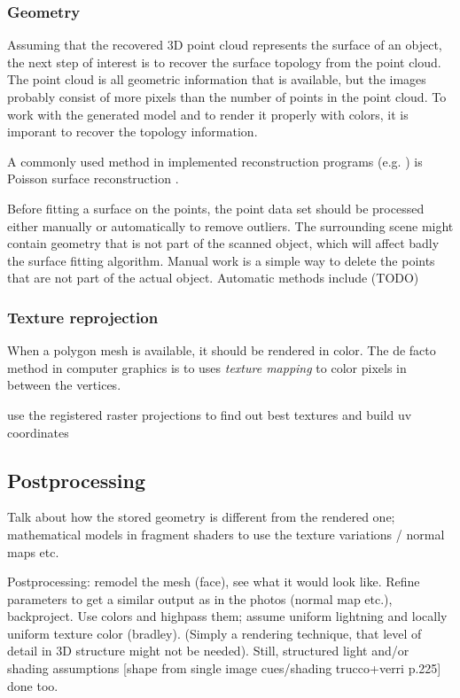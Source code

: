 
\subsubsection{Geometry} %

Assuming that the recovered 3D point cloud represents the surface of an object, the next step of interest is to recover the surface topology from the point cloud.
The point cloud is all geometric information that is available, but the images probably consist of more pixels than the number of points in the point cloud.
To work with the generated model and to render it properly with colors, it is imporant to recover the topology information.

A commonly used method in implemented reconstruction programs (e.g. \cite{meshlab}) is Poisson surface reconstruction \cite{kazhdan2013screened}.

Before fitting a surface on the points, the point data set should be processed either manually or automatically to remove outliers.
The surrounding scene might contain geometry that is not part of the scanned object, which will affect badly the surface fitting algorithm.
Manual work is a simple way to delete the points that are not part of the actual object. Automatic methods include (TODO)


\subsubsection{Texture reprojection} %

When a polygon mesh is available, it should be rendered in color. The de facto method in computer graphics is to uses \textit{texture mapping} to color pixels in between the vertices.

use the registered raster projections to find out best textures and build uv coordinates


\subsection{Postprocessing} %

Talk about how the stored geometry is different from the rendered one; mathematical models in fragment shaders to use the texture variations / normal maps etc.

Postprocessing: remodel the mesh (face), see what it would look like.
Refine parameters to get a similar output as in the photos (normal map etc.), backproject.
Use colors and highpass them; assume uniform lightning and locally uniform texture color (bradley).
(Simply a rendering technique, that level of detail in 3D structure might not be needed).
Still, structured light and/or shading assumptions [shape from single image cues/shading trucco+verri p.225] done too.

